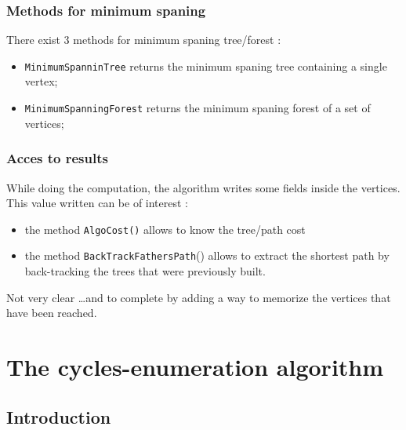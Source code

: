 \subsubsection{Methods for minimum spaning}

There exist $3$ methods for minimum spaning tree/forest :

\begin{itemize}
   \item {\tt MinimumSpanninTree} returns the minimum spaning tree containing a single vertex;

   \item {\tt MinimumSpanningForest} returns the minimum spaning forest of a set of vertices;

\end{itemize}


\subsubsection{Acces to results}

While doing the computation, the algorithm writes some fields inside the vertices.
This value written can be of interest :

\begin{itemize}
   \item  the method {\tt AlgoCost()}  allows to know the tree/path cost
   \item  the method {\tt BackTrackFathersPath}()  allows to extract the shortest path
          by back-tracking  the trees that were previously built.
\end{itemize}

Not very clear \dots and to complete by adding a way to memorize the vertices that have been reached.



\section{The cycles-enumeration algorithm}

\label{Graph:AlgoEnumCycles}


\subsection{Introduction}

